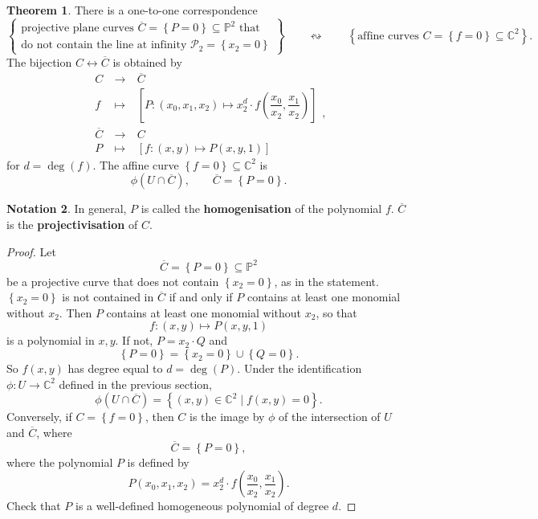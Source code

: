 \documentclass{article}
\newcommand{\C}{\mathbb{C}}
\renewcommand{\P}{\mathbb{P}}
\newcommand{\rb}[1]{\left( #1 \right)}
\renewcommand{\sb}[1]{\left[ #1 \right]}
\newcommand{\cb}[1]{\left\{ #1 \right\}}
\theoremstyle{definition}\newtheorem{definition}{Definition}[section]
\theoremstyle{definition}\newtheorem{notation}[definition]{Notation}
\theoremstyle{definition}\newtheorem{remark}[definition]{Remark}
\theoremstyle{definition}\newtheorem{example1}[definition]{Example}
\theoremstyle{definition}\newtheorem{fact}{Fact}
\theoremstyle{definition}\newtheorem{exercise}{Exercise}
\theoremstyle{definition}\newtheorem*{example2}{Example}
\newtheorem{theorem}[definition]{Theorem}
\begin{document}
\begin{theorem}
There is a one-to-one correspondence
$$ \cb{\begin{array}{c}
\text{projective plane curves } \overline{C} = \cb{P = 0} \subseteq \P^2 \text{ that} \\
\text{do not contain the line at infinity } \mathcal{P}_2 = \cb{x_2 = 0}
\end{array}} \qquad \leftrightsquigarrow \qquad \cb{\text{affine curves } C = \cb{f = 0} \subseteq \C^2}. $$
The bijection $ C \leftrightarrow \overline{C} $ is obtained by
$$
\begin{array}{ccc}
C & \ \to \ & \overline{C} \\
f & \ \mapsto \ & \sb{P : \rb{x_0, x_1, x_2} \mapsto x_2^d \cdot f\rb{\dfrac{x_0}{x_2}, \dfrac{x_1}{x_2}}} \\
\overline{C} & \ \to \ & C \\
P & \ \mapsto \ & \sb{f : \rb{x, y} \mapsto P\rb{x, y, 1}}
\end{array},
$$
for $ d = \deg\rb{f} $. The affine curve $ \cb{f = 0} \subseteq \C^2 $ is
$$ \phi\rb{U \cap \overline{C}}, \qquad \overline{C} = \cb{P = 0}. $$
\end{theorem}

\begin{notation}
In general, $ P $ is called the \textbf{homogenisation} of the polynomial $ f $. $ \overline{C} $ is the \textbf{projectivisation} of $ C $.
\end{notation}

\begin{proof}
Let
$$ \overline{C} = \cb{P = 0} \subseteq \P^2 $$
be a projective curve that does not contain $ \cb{x_2 = 0} $, as in the statement. $ \cb{x_2 = 0} $ is not contained in $ \overline{C} $ if and only if $ P $ contains at least one monomial without $ x_2 $. Then $ P $ contains at least one monomial without $ x_2 $, so that
$$ f : \rb{x, y} \mapsto P\rb{x, y, 1} $$
is a polynomial in $ x, y $. If not, $ P = x_2 \cdot Q $ and
$$ \cb{P = 0} = \cb{x_2 = 0} \cup \cb{Q = 0}. $$
So $ f\rb{x, y} $ has degree equal to $ d = \deg\rb{P} $. Under the identification $ \phi : U \to \C^2 $ defined in the previous section,
$$ \phi\rb{U \cap \overline{C}} = \cb{\rb{x, y} \in \C^2 \mid f\rb{x, y} = 0}. $$
Conversely, if $ C = \cb{f = 0} $, then $ C $ is the image by $ \phi $ of the intersection of $ U $ and $ \overline{C} $, where
$$ \overline{C} = \cb{P = 0}, $$
where the polynomial $ P $ is defined by
$$ P\rb{x_0, x_1, x_2} = x_2^d \cdot f\rb{\dfrac{x_0}{x_2}, \dfrac{x_1}{x_2}}. $$
Check that $ P $ is a well-defined homogeneous polynomial of degree $ d $.
\end{proof}
\end{document}
